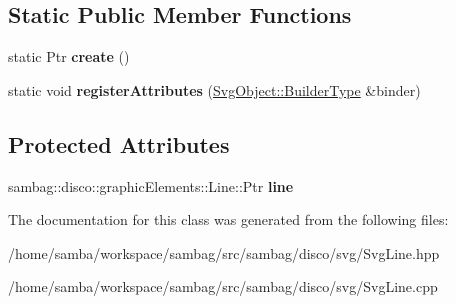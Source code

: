 \subsection*{Static Public Member Functions}
\begin{DoxyCompactItemize}
\item 
\hypertarget{classsambag_1_1disco_1_1svg_1_1_svg_line_ade22e529c325991ced1af206998bad76}{
static Ptr {\bfseries create} ()}
\label{classsambag_1_1disco_1_1svg_1_1_svg_line_ade22e529c325991ced1af206998bad76}

\item 
\hypertarget{classsambag_1_1disco_1_1svg_1_1_svg_line_aa02807989c1f5cc0f5a5d471432d25d3}{
static void {\bfseries registerAttributes} (\hyperlink{classsambag_1_1xml_1_1_x_m_l2_object}{SvgObject::BuilderType} \&binder)}
\label{classsambag_1_1disco_1_1svg_1_1_svg_line_aa02807989c1f5cc0f5a5d471432d25d3}

\end{DoxyCompactItemize}
\subsection*{Protected Attributes}
\begin{DoxyCompactItemize}
\item 
\hypertarget{classsambag_1_1disco_1_1svg_1_1_svg_line_a5809901aa9ac6b40cf4a2f9ab2b1bbc7}{
sambag::disco::graphicElements::Line::Ptr {\bfseries line}}
\label{classsambag_1_1disco_1_1svg_1_1_svg_line_a5809901aa9ac6b40cf4a2f9ab2b1bbc7}

\end{DoxyCompactItemize}


The documentation for this class was generated from the following files:\begin{DoxyCompactItemize}
\item 
/home/samba/workspace/sambag/src/sambag/disco/svg/SvgLine.hpp\item 
/home/samba/workspace/sambag/src/sambag/disco/svg/SvgLine.cpp\end{DoxyCompactItemize}

